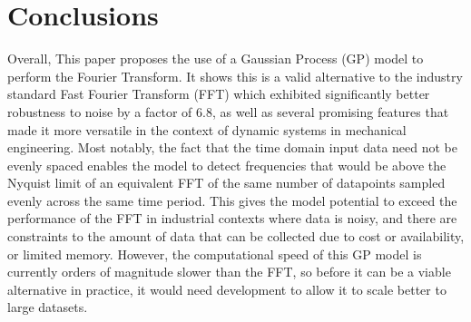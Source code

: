 \documentclass[12pt]{article}
\begin{document}
    \section{Conclusions}
    Overall, This paper proposes the use of a Gaussian Process (GP) model to perform the Fourier Transform.
    It shows this is a valid alternative to the industry standard Fast Fourier Transform (FFT) which exhibited significantly better robustness to noise by a factor of 6.8, as well as several promising features that made it more versatile in the context of dynamic systems in mechanical engineering.
    Most notably, the fact that the time domain input data need not be evenly spaced enables the model to detect frequencies that would be above the Nyquist limit of an equivalent FFT of the same number of datapoints sampled evenly across the same time period.
    This gives the model potential to exceed the performance of the FFT in industrial contexts where data is noisy, and there are constraints to the amount of data that can be collected due to cost or availability, or limited memory.
    However, the computational speed of this GP model is currently orders of magnitude slower than the FFT, so before it can be a viable alternative in practice, it would need development to allow it to scale better to large datasets.

    \FloatBarrier

    \newpage
    \printbibliography
    \newpage
    
\end{document}
